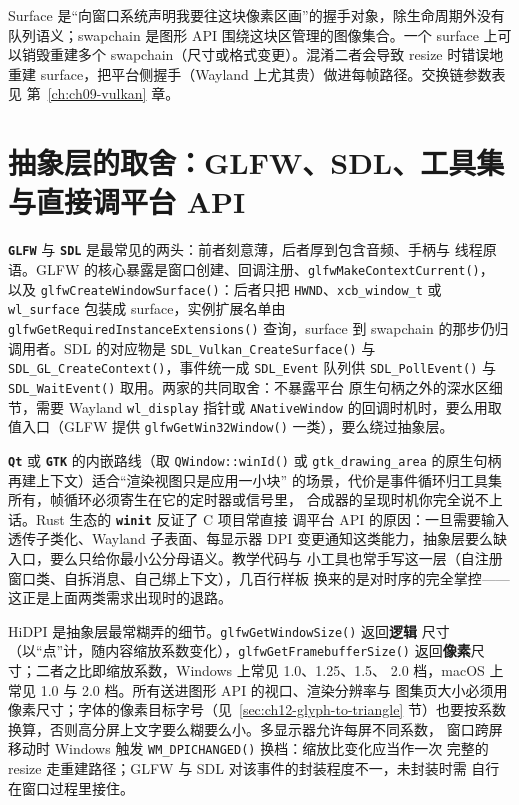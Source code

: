 \documentclass[12pt,a4paper,fontset=fandol]{ctexbook}
\newcommand{\Fn}[1]{\texttt{#1()}}
\newcommand{\Tp}[1]{\texttt{#1}}
\newcommand{\Bk}{\discretionary{}{}{}}
\newcommand{\Lib}[1]{\textbf{\texttt{#1}}}
\begin{document}
\begin{note}[title={surface 与 swapchain 不是同一层东西}]
Surface 是``向窗口系统声明我要往这块像素区画''的握手对象，除生命周期外没有
队列语义；swapchain 是图形 API 围绕这块区管理的图像集合。一个 surface 上可
以销毁重建多个 swapchain（尺寸或格式变更）。混淆二者会导致 resize 时错误地
重建 surface，把平台侧握手（Wayland 上尤其贵）做进每帧路径。交换链参数表见
第~\ref{ch:ch09-vulkan} 章。
\end{note}

\section{抽象层的取舍：GLFW、SDL、工具集与直接调平台 API}
\label{sec:ch12-abstraction-choice}

\Lib{GLFW} 与 \Lib{SDL} 是最常见的两头：前者刻意薄，后者厚到包含音频、手柄与
线程原语。GLFW 的核心暴露是窗口创建、回调注册、\Fn{glfw{\Bk}Make{\Bk}ContextCurrent}，
以及 \Fn{glfw{\Bk}Create{\Bk}Window{\Bk}Surface}：后者只把 \Tp{HWND}、\Tp{xcb\_{\Bk}window\_{\Bk}t}
或 \Tp{wl\_surface} 包装成 surface，实例扩展名单由
\Fn{glfwGet{\Bk}Required{\Bk}Instance{\Bk}Extensions} 查询，surface 到
swapchain 的那步仍归调用者。SDL 的对应物是 \Fn{SDL\_{\Bk}Vulkan\Bk\_{\Bk}Create{\Bk}Surface}
与 \Fn{SDL\_{\Bk}GL\_{\Bk}Create{\Bk}Context}，事件统一成 \Tp{SDL\_Event} 队列供
\Fn{SDL\_{\Bk}Poll{\Bk}Event} 与 \Fn{SDL\_{\Bk}Wait{\Bk}Event} 取用。两家的共同取舍：不暴露平台
原生句柄之外的深水区细节，需要 Wayland \Tp{wl\_display} 指针或
\Tp{ANative{\Bk}Window} 的回调时机时，要么用取值入口（GLFW 提供
\Fn{glfw{\Bk}Get{\Bk}Win32{\Bk}Window} 一类），要么绕过抽象层。

\Lib{Qt} 或 \Lib{GTK} 的内嵌路线（取 \Fn{QWindow::winId} 或
\Tp{gtk\_drawing\_area} 的原生句柄再建上下文）适合``渲染视图只是应用一小块''
的场景，代价是事件循环归工具集所有，帧循环必须寄生在它的定时器或信号里，
合成器的呈现时机你完全说不上话。Rust 生态的 \Lib{winit} 反证了 C 项目常直接
调平台 API 的原因：一旦需要输入透传子类化、Wayland 子表面、每显示器 DPI
变更通知这类能力，抽象层要么缺入口，要么只给你最小公分母语义。教学代码与
小工具也常手写这一层（自注册窗口类、自拆消息、自己绑上下文），几百行样板
换来的是对时序的完全掌控——这正是上面两类需求出现时的退路。

HiDPI 是抽象层最常糊弄的细节。\Fn{glfwGet{\Bk}WindowSize} 返回\textbf{逻辑}
尺寸（以``点''计，随内容缩放系数变化），\Fn{glfwGet{\Bk}Framebuffer{\Bk}Size}
返回\textbf{像素}尺寸；二者之比即缩放系数，Windows 上常见 1.0、1.25、1.5、
2.0 档，macOS 上常见 1.0 与 2.0 档。所有送进图形 API 的视口、渲染分辨率与
图集页大小必须用像素尺寸；字体的像素目标字号（见~\ref{sec:ch12-glyph-to-triangle}
节）也要按系数换算，否则高分屏上文字要么糊要么小。多显示器允许每屏不同系数，
窗口跨屏移动时 Windows 触发 \Fn{WM\_DPICHANGED} 换档：缩放比变化应当作一次
完整的 resize 走重建路径；GLFW 与 SDL 对该事件的封装程度不一，未封装时需
自行在窗口过程里接住。
\end{document}
